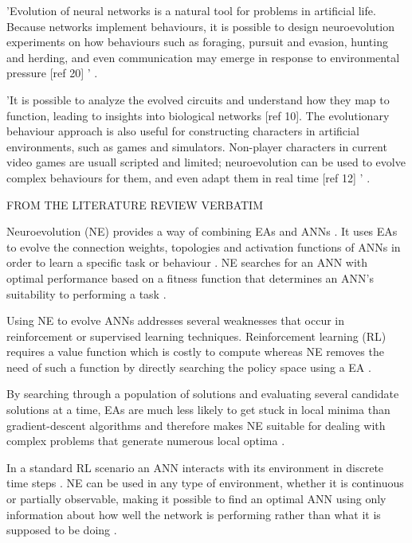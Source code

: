 'Evolution of neural networks is a natural tool for problems in artificial life. Because networks implement behaviours, it is possible to design neuroevolution experiments on how behaviours such as foraging, pursuit and evasion, hunting and herding, and even communication may emerge in response to environmental pressure [ref 20] ' \cite{Miikkulainen2010}.

'It is possible to analyze the evolved circuits and understand how they map to function, leading to insights into biological networks [ref 10]. The evolutionary behaviour approach is also useful for constructing characters in artificial environments, such as games and simulators. Non-player characters in current video games are usuall scripted and limited; neuroevolution can be used to evolve complex behaviours for them, and even adapt them in real time [ref 12] ' \cite{Miikkulainen2010}.


FROM THE LITERATURE REVIEW VERBATIM


Neuroevolution (NE) provides a way of combining EAs and ANNs \cite{RefWorks:31}. It uses EAs to evolve the connection weights, topologies and activation functions of ANNs in order to learn a specific task or behaviour \cite{gomez1999solving}. NE searches for an ANN with optimal performance based on a fitness function that determines an ANN's suitability to performing a task \cite{RefWorks:31}.

Using NE to evolve ANNs addresses several weaknesses that occur in reinforcement or supervised learning techniques. Reinforcement learning (RL) requires a value function which is costly to compute whereas NE removes the need of such a function by directly searching the policy space using a EA \cite{RefWorks:32}.

By searching through a population of solutions and evaluating several candidate solutions at a time, EAs are much less likely to get stuck in local minima than gradient-descent algorithms and therefore makes NE suitable for dealing with complex problems that generate numerous local optima \cite{gomez2001neuro,RefWorks:1}.

In a standard RL scenario an ANN interacts with its environment in discrete time steps \cite{igel2003neuroevolution}. NE can be used in any type of environment, whether it is continuous or partially observable, making it possible to find an optimal ANN using only information about how well the network is performing rather than what it is supposed to be doing \cite{Miikkulainen:2010:ENN:1830761.1830902}.

